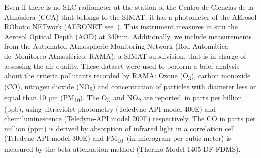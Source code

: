 \documentclass{article}
\begin{document}
Even if there is no SLC radiometer at the station of the Centro de
Ciencias de la Atmósfera (CCA) that belongs to the SIMAT, it has a
photometer of the AErosol RObotic NETwork (AERONET
see~\cite{Holben_1998}). This instrument measures in situ the Aerosol
Optical Depth (AOD) at 340nm. Additionally, we include measurements from
the Automated Atmospheric Monitoring Network (Red Automática
de~Monitoreo Atmosférico, RAMA), a SIMAT subdivision, that is in charge
of assessing the air quality. These dataset were used to perform a brief
analysis about the criteria pollutants recorded by RAMA: Ozone
(O\textsubscript{3}), carbon monoxide (CO), nitrogen dioxide
(NO\textsubscript{2}) and concentration of particles with diameter less
or equal than 10 μm (PM\textsubscript{10}). The O\textsubscript{3}~and
NO\textsubscript{2} are reported~in parts per billion (ppb), using
ultraviolet photometry (Teledyne API model 400E) and chemiluminescence
(Teledyne-API model 200E) respectively. The CO in parts per million
(ppm) is derived by absorption of infrared light in a correlation cell
(Teledyne API model 300E) and PM\textsubscript{10}~(in microgram per
cubic meter) is measured by the beta attenuation method (Thermo Model
1405-DF FDMS).
\end{document}
